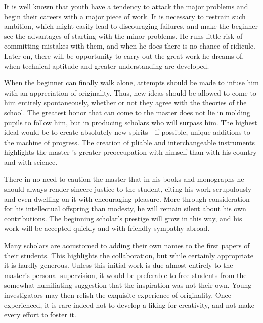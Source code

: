 \documentclass{article}
\begin{document}
It is well known that youth have a tendency to attack the major problems and begin their careers with a major piece of work. It is necessary to restrain such ambition, which might easily lead to discouraging failures, and make the beginner see the advantages of starting with the minor problems. He runs little risk of committing mistakes with them, and when he does there is no chance of ridicule. Later on, there will be opportunity to carry out the great work he dreams of, when technical aptitude and greater understanding are developed.

When the beginner can finally walk alone, attempts should be made to infuse him with an appreciation of originality. Thus, new ideas should be allowed to come to him entirely spontaneously, whether or not they agree with the theories of the school. The greatest honor that can come to the master does not lie in molding pupils to follow him, but in producing scholars who will surpass him. The highest ideal would be to create absolutely new spirits - if possible, unique additions to the machine of progress. The creation of pliable and interchangeable instruments highlights the master ’s greater preoccupation with himself than with his country and with science.

There in no need to caution the master that in his books and monographs he should always render sincere justice to the student, citing his work scrupulously and even dwelling on it with encouraging pleasure. More through consideration for his intellectual offspring than modesty, he will remain silent about his own contributions. The beginning scholar’s prestige will grow in this way, and his work will be accepted quickly and with friendly sympathy abroad.

Many scholars are accustomed to adding their own names to the first papers of their students. This highlights the collaboration, but while certainly appropriate it is hardly generous. Unless this initial work is due almost entirely to the master’s personal supervision, it would be preferable to free students from the somewhat humiliating suggestion that the inspiration was not their own. Young investigators may then relish the exquisite experience of originality. Once experienced, it is rare indeed not to develop a liking for creativity, and not make every effort to foster it.
\end{document}
